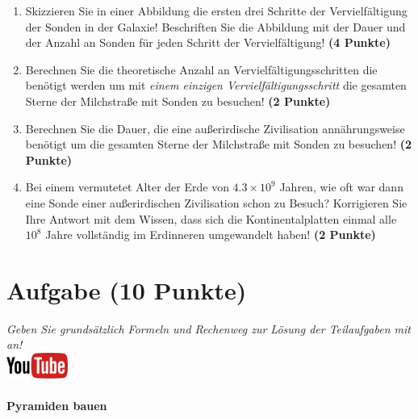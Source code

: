 \documentclass[a4paper, 9pt]{scrartcl}\usepackage[]{graphicx}\usepackage[]{xcolor}
\begin{document}
\begin{enumerate}
\item Skizzieren Sie in einer Abbildung die ersten drei Schritte der
  Vervielf{\"a}ltigung der Sonden in der Galaxie! Beschriften Sie die Abbildung
  mit der Dauer und der Anzahl an Sonden f{\"u}r jeden Schritt der Vervielf{\"a}ltigung! \textbf{(4 Punkte)}
\item Berechnen Sie die theoretische Anzahl an Vervielf{\"a}ltigungsschritten die
  ben{\"o}tigt werden um mit \textit{einem einzigen Vervielf{\"a}ltigungsschritt} die
  gesamten Sterne der Milchstra{\ss}e mit Sonden zu besuchen! \textbf{(2 Punkte)}
\item Berechnen Sie die Dauer, die eine au{\ss}erirdische Zivilisation
  ann{\"a}hrungsweise ben{\"o}tigt um die gesamten Sterne der Milchstra{\ss}e mit
  Sonden zu besuchen! \textbf{(2 Punkte)}
\item Bei einem vermutetet Alter der Erde von $\ensuremath{4.3\times 10^{9}}$ Jahren,
  wie oft war dann eine Sonde einer au{\ss}erirdischen Zivilisation schon zu
  Besuch? Korrigieren Sie Ihre Antwort mit dem Wissen, dass sich die
  Kontinentalplatten einmal alle $\ensuremath{10^{8}}$ Jahre vollst{\"a}ndig im
  Erdinneren umgewandelt haben! \textbf{(2 Punkte)}
\end{enumerate}


 
\clearpage

\section{Aufgabe \hfill (10 Punkte)}

\textit{Geben Sie grunds{\"a}tzlich Formeln und Rechenweg zur L{\"o}sung der
  Teilaufgaben mit an!} \\[1Ex]

\hfill\href{https://youtu.be/tDgr6fpkkYA}{\includegraphics[width =
  2cm]{img/youtube}} %
\hspace{2Ex}

\paragraph{Pyramiden bauen}
\end{document}
